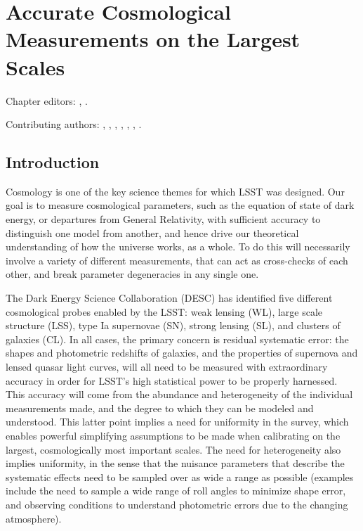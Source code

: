 
\chapter[Cosmology]{Accurate Cosmological Measurements on the Largest Scales}
\def\chpname{cosmo}\label{chp:\chpname}

Chapter editors:
,
.

Contributing authors:
,
,
,
,
,
,
.


\section{Introduction}
\label{sec:\chpname:intro}

Cosmology is one of the key science themes for which LSST was
designed. Our goal is to measure cosmological parameters, such as the
equation of state of dark energy, or departures from General
Relativity, with sufficient accuracy to distinguish one model from
another, and hence drive our theoretical understanding of how the
universe works, as a whole. To do this will necessarily involve a
variety of different measurements, that can act as cross-checks of
each other, and break parameter degeneracies in any single one.

The  Dark Energy Science Collaboration (DESC) has identified five
different cosmological probes enabled by the LSST: weak lensing (WL),
large scale structure (LSS), type Ia supernovae (SN), strong lensing
(SL), and clusters of galaxies (CL). In all cases, the primary concern
is residual systematic error: the shapes and photometric redshifts of
galaxies, and the properties of supernova and lensed quasar light
curves, will all need to be measured with extraordinary accuracy in
order for LSST's high statistical power to be properly harnessed. This
accuracy will come from the abundance and heterogeneity of the
individual measurements made, and the degree to which they can be
modeled and understood. This latter point implies a need for uniformity
in the survey, which enables powerful simplifying assumptions to be made
when calibrating on the largest, cosmologically most important scales.
The need for heterogeneity also implies  uniformity, in the sense that
the nuisance parameters that describe the systematic effects need to be
sampled over as wide a range as possible (examples include the need to
sample a wide range of roll angles to minimize shape error, and
observing conditions to understand photometric errors due to the
changing atmosphere).

